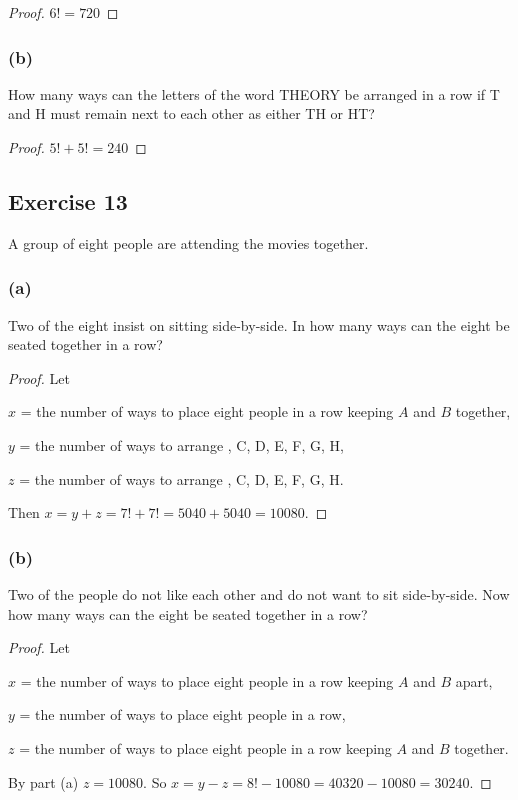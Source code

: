 \documentclass[14pt]{extarticle}
\begin{document}
\begin{proof}
\(6! = 720\)
\end{proof}

\subsubsection{(b)}
How many ways can the letters of the word THEORY be arranged in a row if T and H must remain next to each other 
as either TH or HT?

\begin{proof}
\(5! + 5! = 240\)
\end{proof}

\subsection{Exercise 13}
A group of eight people are attending the movies together.

\subsubsection{(a)}
Two of the eight insist on sitting side-by-side. In how many ways can the eight be seated together in a row?

\begin{proof}
Let

$x$ = the number of ways to place eight people in a row keeping $A$ and $B$ together,

$y$ = the number of ways to arrange , C, D, E, F, G, H,

$z$ = the number of ways to arrange , C, D, E, F, G, H.

Then \(x = y+z = 7!+7! = 5040+5040 = 10080\).
\end{proof}

\subsubsection{(b)}
Two of the people do not like each other and do not want to sit side-by-side. Now how many ways can the eight be seated 
together in a row?

\begin{proof}
Let

$x$ = the number of ways to place eight people in a row keeping $A$ and $B$ apart,

$y$ = the number of ways to place eight people in a row,

$z$ = the number of ways to place eight people in a row keeping $A$ and $B$ together.

By part (a) $z = 10080$. So \(x = y-z = 8!-10080 = 40320-10080 = 30240\).
\end{proof}
\end{document}
